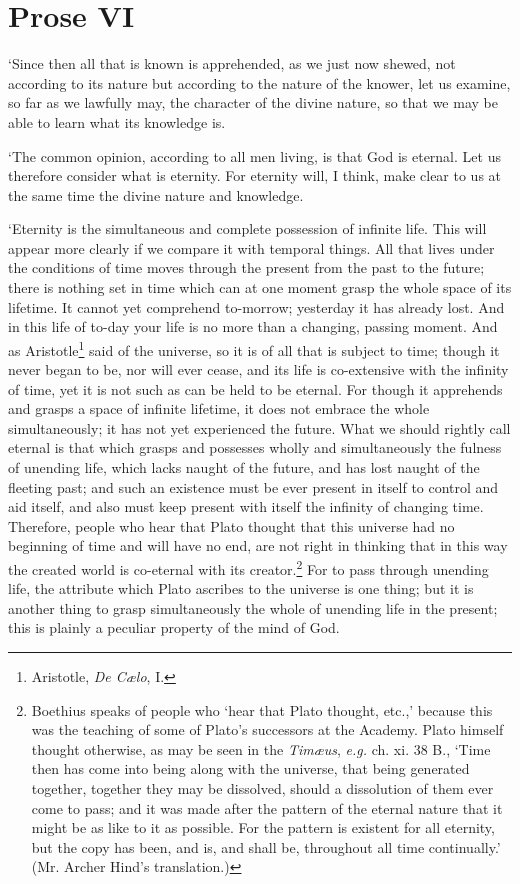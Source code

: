 \section*{Prose VI}

`Since then all that is known is apprehended, as we just now shewed,
not according to its nature but according to the nature of the knower,
let us examine, so far as we lawfully may, the character of the divine
nature, so that we may be able to learn what its knowledge is.

`The common opinion, according to all men living, is that God is
eternal. Let us therefore consider what is eternity. For eternity
will, I think, make clear to us at the same time the divine nature and
knowledge.

`Eternity is the simultaneous and complete possession of infinite
life. This will appear more clearly if we compare it with temporal
 things. All that lives under the conditions of time moves
through the present from the past to the future; there is nothing set
in time which can at one moment grasp the whole space of its lifetime.
It cannot yet comprehend to-morrow; yesterday it has already lost. And
in this life of to-day your life is no more than a changing, passing
moment. And as Aristotle\footnote{Aristotle, \textit{De C\ae lo},
\textsc{I}.} said of the universe, so it is of all that is subject to
time; though it never began to be, nor will ever cease, and its life
is co-extensive with the infinity of time, yet it is not such as can
be held to be eternal. For though it apprehends and grasps a space of
infinite lifetime, it does not embrace the whole simultaneously; it
has not yet experienced the future. What we should rightly call
eternal is that which grasps and possesses wholly and simultaneously
the fulness of unending life, which lacks naught of the future, and
has lost naught of the fleeting past; and such an existence must be
ever present in itself to control and aid itself, and also must keep
present with itself the infinity of changing time. Therefore, people
who hear that Plato thought that this universe had no beginning of
time and will have no end, are not right in thinking that in this way
the created world is co-eternal with its creator.\footnote{Boethius
speaks of people who `hear that Plato thought, etc.,' because this was
the teaching of some of Plato's successors at the Academy. Plato
himself thought otherwise, as may be seen in the \textit{Tim\ae us},
\textit{e.g.} ch. xi. 38 \textsc{B}., `Time then has come into being
along with the universe, that being generated together, together they
may be dissolved, should a dissolution of them ever come to pass; and
it was made after the pattern of the eternal nature that it might be
as like to it as possible. For the pattern is existent for all
eternity, but the copy has been, and is, and shall be, throughout all
time continually.' (Mr. Archer Hind's translation.)}  For to
pass through unending life, the attribute which Plato ascribes to the
universe is one thing; but it is another thing to grasp simultaneously
the whole of unending life in the present; this is plainly a peculiar
property of the mind of God.

